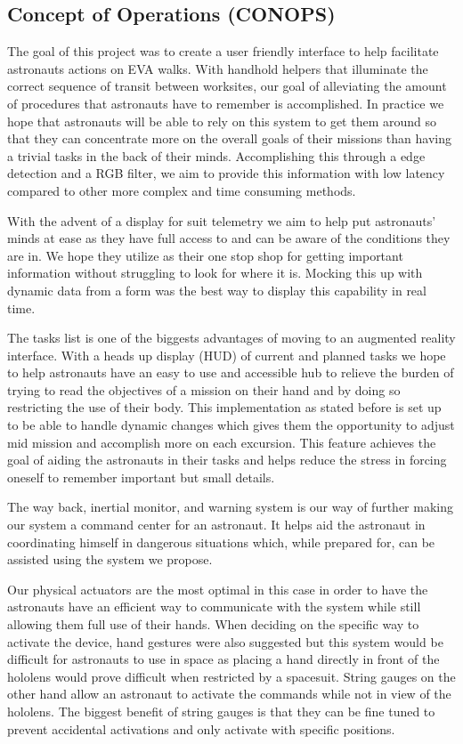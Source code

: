 \documentclass{article}
\let\Oldsubsection\subsection
\renewcommand{\subsection}{\FloatBarrier\Oldsubsection}
\begin{document}
\subsection{Concept of Operations (CONOPS)}

The goal of this project was to create a user friendly interface to help 
facilitate astronauts actions on EVA walks. With handhold helpers that 
illuminate the correct sequence of transit between worksites, our goal 
of alleviating the amount of procedures that astronauts have to remember 
is accomplished. In practice we hope that astronauts will be able to 
rely on this system to get them around so that they can concentrate more 
on the overall goals of their missions than having a trivial tasks in 
the back of their minds. Accomplishing this through a edge detection and 
a RGB filter, we aim to provide this information with low latency 
compared to other more complex and time consuming methods.

With the advent of a display for suit telemetry we aim to help put 
astronauts’ minds at ease as they have full access to and can be aware 
of the conditions they are in. We hope they utilize as their one stop 
shop for getting important information without struggling to look for 
where it is. Mocking this up with dynamic data from a form was the best 
way to display this capability in real time.

The tasks list is one of the biggests advantages of moving to an 
augmented reality interface. With a heads up display (HUD) of current 
and planned tasks we hope to help astronauts have an easy to use and 
accessible hub to relieve the burden of trying to read the objectives of 
a mission on their hand and by doing so restricting the use of their 
body. This implementation as stated before is set up to be able to 
handle dynamic changes which gives them the opportunity to adjust mid 
mission and accomplish more on each excursion. This feature achieves the 
goal of aiding the astronauts in their tasks and helps reduce the stress 
in forcing oneself to remember important but small details.

The way back, inertial monitor, and warning system is our way of further 
making our system a command center for an astronaut. It helps aid the 
astronaut in coordinating himself in dangerous situations which, while 
prepared for, can be assisted using the system we propose.

Our physical actuators are the most optimal in this case in order to 
have the astronauts have an efficient way to communicate with the system 
while still allowing them full use of their hands. When deciding on the 
specific way to activate the device, hand gestures were also suggested 
but this system would be difficult for astronauts to use in space as 
placing a hand directly in front of the hololens would prove difficult 
when restricted by a spacesuit. String gauges on the other hand allow an 
astronaut to activate the commands while not in view of the hololens. 
The biggest benefit of string gauges is that they can be fine tuned to 
prevent accidental activations and only activate with specific 
positions.
\end{document}
